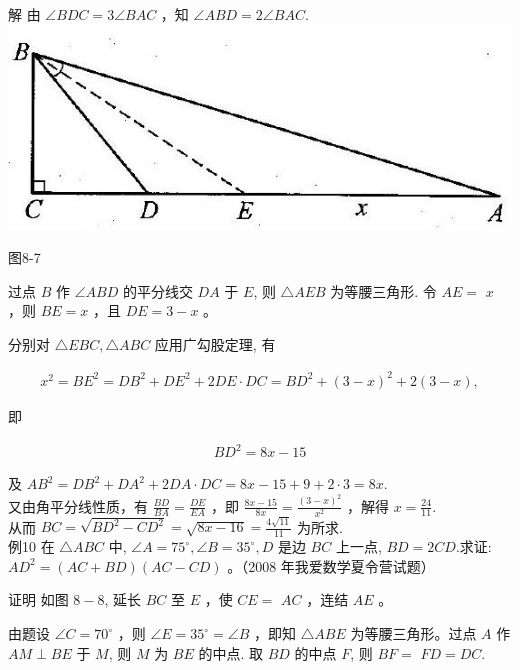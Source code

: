 \documentclass[10pt]{article}
\begin{document}
解 由 $\angle B D C=3 \angle B A C$ ，知 $\angle A B D=2 \angle B A C$.\\
\includegraphics[max width=\textwidth, center]{2024_10_30_2c8f45efd4a519b08e1ag-085}

图8-7

过点 $B$ 作 $\angle A B D$ 的平分线交 $D A$ 于 $E$, 则 $\triangle A E B$ 为等腰三角形. 令 $A E=$ $x$ ，则 $B E=x$ ，且 $D E=3-x$ 。

分别对 $\triangle E B C, \triangle A B C$ 应用广勾股定理, 有

\begin{align*}
x^{2}=B E^{2}=D B^{2}+D E^{2}+2 D E \cdot D C=B D^{2}+(3-x)^{2}+2(3-x),
\end{align*}

即

\begin{align*}
B D^{2}=8 x-15
\end{align*}

及 $A B^{2}=D B^{2}+D A^{2}+2 D A \cdot D C=8 x-15+9+2 \cdot 3=8 x$.\\
又由角平分线性质，有 $\frac{B D}{B A}=\frac{D E}{E A}$ ，即 $\frac{8 x-15}{8 x}=\frac{(3-x)^{2}}{x^{2}}$ ，解得 $x=\frac{24}{11}$.\\
从而 $B C=\sqrt{B D^{2}-C D^{2}}=\sqrt{8 x-16}=\frac{4 \sqrt{11}}{11}$ 为所求.\\
例10 在 $\triangle A B C$ 中, $\angle A=75^{\circ}, \angle B=35^{\circ}, D$ 是边 $B C$ 上一点, $B D=2 C D$.求证: $A D^{2}=(A C+B D)(A C-C D)$ 。（2008 年我爱数学夏令营试题）

证明 如图 $8-8$, 延长 $B C$ 至 $E$ ，使 $C E=$ $A C$ ，连结 $A E$ 。

由题设 $\angle C=70^{\circ}$ ，则 $\angle E=35^{\circ}=\angle B$ ，即知 $\triangle A B E$ 为等腰三角形。过点 $A$ 作 $A M \perp B E$ 于 $M$, 则 $M$ 为 $B E$ 的中点. 取 $B D$ 的中点 $F$, 则 $B F=$ $F D=D C$.
\end{document}
